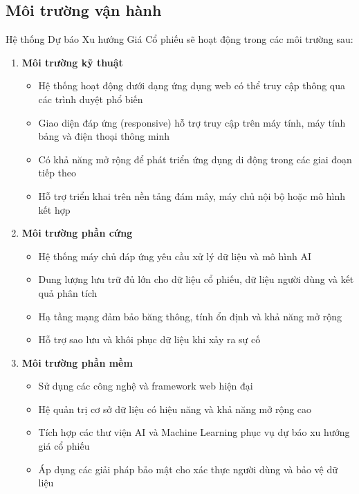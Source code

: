 \documentclass[12pt, a4paper]{article}
\begin{document}
\subsection{Môi trường vận hành}

Hệ thống Dự báo Xu hướng Giá Cổ phiếu sẽ hoạt động trong các môi trường sau:

\begin{enumerate}
    \renewcommand{\labelenumi}{\arabic{enumi})}

    \item \textbf{Môi trường kỹ thuật}
          \begin{itemize}
              \item Hệ thống hoạt động dưới dạng ứng dụng web có thể truy cập thông qua các trình duyệt phổ biến
              \item Giao diện đáp ứng (responsive) hỗ trợ truy cập trên máy tính, máy tính bảng và điện thoại thông minh
              \item Có khả năng mở rộng để phát triển ứng dụng di động trong các giai đoạn tiếp theo
              \item Hỗ trợ triển khai trên nền tảng đám mây, máy chủ nội bộ hoặc mô hình kết hợp
          \end{itemize}

    \item \textbf{Môi trường phần cứng}
          \begin{itemize}
              \item Hệ thống máy chủ đáp ứng yêu cầu xử lý dữ liệu và mô hình AI
              \item Dung lượng lưu trữ đủ lớn cho dữ liệu cổ phiếu, dữ liệu người dùng và kết quả phân tích
              \item Hạ tầng mạng đảm bảo băng thông, tính ổn định và khả năng mở rộng
              \item Hỗ trợ sao lưu và khôi phục dữ liệu khi xảy ra sự cố
          \end{itemize}

    \item \textbf{Môi trường phần mềm}
          \begin{itemize}
              \item Sử dụng các công nghệ và framework web hiện đại
              \item Hệ quản trị cơ sở dữ liệu có hiệu năng và khả năng mở rộng cao
              \item Tích hợp các thư viện AI và Machine Learning phục vụ dự báo xu hướng giá cổ phiếu
              \item Áp dụng các giải pháp bảo mật cho xác thực người dùng và bảo vệ dữ liệu
          \end{itemize}


\end{enumerate}
\end{document}
